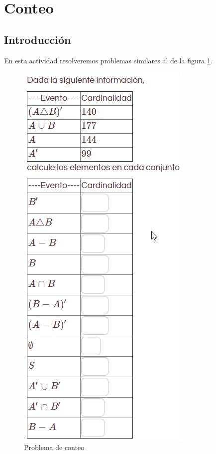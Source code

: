 \section{Conteo}

\subsection{Introducción}

En esta actividad resolveremos problemas similares al de la figura \ref{fig:problema-conteo}.

\begin{figure}[h]
	\centering
	\includegraphics[width=0.7\linewidth]{images/2020-08-15 19_49_02}
	\caption{Problema de conteo}
	\label{fig:problema-conteo}
\end{figure}

